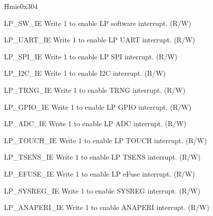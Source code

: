 \begin{register}{H}{mie}{0x304}\label{regdesc:LPMIE}
%
%
%
%
%
%
%
%
%
%
%
%
%
%
%
%
%
%
%
%
%
%
%
\regnewline%
\begin{regdesc}\begin{reglist}
\label{fielddesc:LPMIELPSWIE}\item [LP\_SW\_IE] Write 1 to enable LP software interrupt. (R/W)
\label{fielddesc:LPMILPUARTIE}\item [LP\_UART\_IE] Write 1 to enable LP UART interrupt. (R/W)
\label{fielddesc:LPMIELPSPIIE}\item [LP\_SPI\_IE] Write 1 to enable LP SPI interrupt. (R/W)
\label{fielddesc:LPMIEI2CIE}\item [LP\_I2C\_IE] Write 1 to enable I2C interrupt. (R/W)
\label{fielddesc:LPMIETRNGIE}\item [LP\_TRNG\_IE] Write 1 to enable TRNG interrupt. (R/W)
\label{fielddesc:LPMIEGPIOIE}\item [LP\_GPIO\_IE] Write 1 to enable LP GPIO interrupt. (R/W)
\label{fielddesc:LPMIEADCIE}\item [LP\_ADC\_IE] Write 1 to enable LP ADC interrupt. (R/W)
\label{fielddesc:LPMIETOUCHIE}\item [LP\_TOUCH\_IE] Write 1 to enable LP TOUCH interrupt. (R/W)
\label{fielddesc:LPMIETSENSIE}\item [LP\_TSENS\_IE] Write 1 to enable LP TSENS interrupt. (R/W)
\label{fielddesc:LPMIEEFUSEIE}\item [LP\_EFUSE\_IE] Write 1 to enable LP eFuse interrupt. (R/W)
\label{fielddesc:LPMIESYSREGIE}\item [LP\_SYSREG\_IE] Write 1 to enable SYSREG interrupt. (R/W)
\label{fielddesc:LPMIEANAPERIIE}\item [LP\_ANAPERI\_IE] Write 1 to enable ANAPERI interrupt. (R/W)

\end{reglist}
\end{regdesc}
\end{register}
